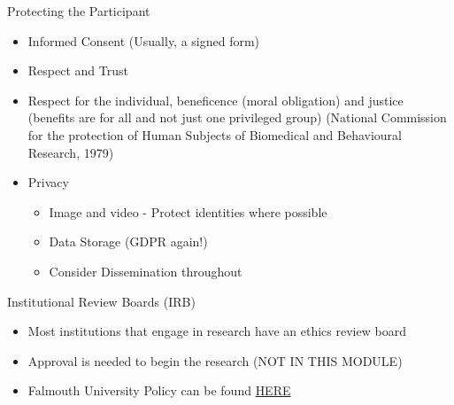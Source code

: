 \documentclass[ignorenonframetext,]{beamer}
\providecommand{\tightlist}{%
  \setlength{\itemsep}{0pt}\setlength{\parskip}{0pt}}
\begin{document}
\begin{frame}{Protecting the Participant}

\begin{itemize}
\item
  Informed Consent (Usually, a signed form)
\item
  Respect and Trust
\item
  Respect for the individual, beneficence (moral obligation) and justice
  (benefits are for all and not just one privileged group) (National
  Commission for the protection of Human Subjects of Biomedical and
  Behavioural Research, 1979)
\item
  Privacy

  \begin{itemize}
  \tightlist
  \item
    Image and video - Protect identities where possible
  \item
    Data Storage (GDPR again!)
  \item
    Consider Dissemination throughout
  \end{itemize}
\end{itemize}

\end{frame}

\begin{frame}{Institutional Review Boards (IRB)}

\begin{itemize}
\tightlist
\item
  Most institutions that engage in research have an ethics review board
\item
  Approval is needed to begin the research (NOT IN THIS MODULE)
\item
  Falmouth University Policy can be found
  \href{https://www.falmouth.ac.uk/sites/default/files/download/research_ethics_policy-13nov15.pdf}{HERE}
\end{itemize}

\end{frame}
\end{document}
